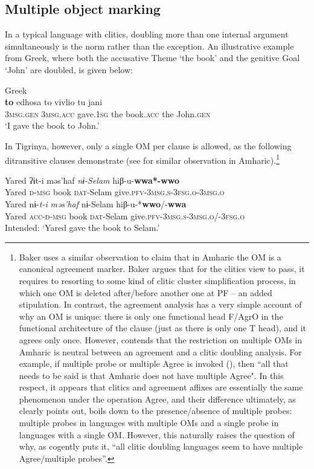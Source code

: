 \documentclass[output=paper]{langscibook}
\begin{document}
\subsection{Multiple object marking}\largerpage

In a typical language with clitics, doubling more than one internal argument simultaneously is the norm rather than the exception. An illustrative example from Greek, where both the accusative Theme `the book' and the genitive Goal `John' are doubled, is given below:

\ea Greek \citep[548]{ana05}\\
 {\textbf{to}} edhosa to vivlio tu jani\\
{\scshape 3msg.gen} {\scshape 3msg.acc} gave.{\scshape 1sg} the book.{\scshape acc} the John.{\scshape gen}\\
\glt `I gave the book to John.' 
\z

\noindent In Tigrinya, however, only a single OM per clause is allowed, as the following ditransitive clauses demonstrate (see \citet[8]{baker12} for similar observation in Amharic).\footnote{Baker uses a similar observation to claim that in Amharic the OM is a canonical agreement marker. Baker argues that for the clitics view to pass, it requires to resorting to some kind of clitic cluster simplification process, in which one OM is deleted after/before another one at PF -- an added stipulation. In contrast, the agreement analysis has a very simple account of why an OM is unique: there is only one functional head F/AgrO in the functional architecture of the clause (just as there is only one T head), and it agrees only once. However, \citep[624--625]{kramer14} contends that the restriction on multiple OMs in Amharic is neutral between an agreement and a clitic doubling analysis. For example, if multiple probe or multiple Agree is invoked (\citealt{hiraiwa05}), then ``all that needs to be said is that Amharic does not have multiple Agree". In this respect, it appears that clitics and agreement affixes are essentially the same phenomenon under the operation Agree, and their difference ultimately, as \citealt{kramer14} clearly points out, boils down to the presence/absence of multiple probes: multiple probes in languages with multiple OMs and a single probe in languages with a single OM. However, this naturally raises the question of why, as \citep[626]{kramer14} cogently puts it, ``all clitic doubling languages seem to have multiple Agree/multiple probes''.} 


\ea\label{ex:Gebregziabher:double-obj} 
\ea\label{ex:Gebregziabher:double1} 
\gll Yared ʔɨt-i məs'haf \textit{nɨ-Selam} hiβ-u-\textbf{wwa*-wwo} \\
Yared {\scshape d-msg} book {\scshape dat-}Selam give.{\scshape pfv-3msg.s-3fsg.o}{\scshape -3msg.o}\\
\ex\label{ex:Gebregziabher:double2} 
\gll Yared nɨ-\textit{t-i} \textit{məs'haf} nɨ-Selam hiβ-u-*\textbf{wwo}/-\textbf{wwa} \\
Yared {\scshape acc}-{\scshape d-msg} book {\scshape dat-}Selam give.{\scshape pfv-3msg.s-3msg.o}/-{\scshape 3fsg.o} \\
\glt Intended: `Yared gave the book to Selam.'
\z
\z\largerpage
\end{document}
